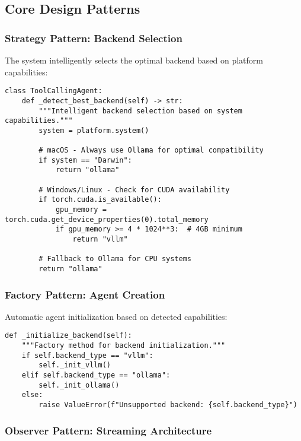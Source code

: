 \documentclass{article}
\begin{document}
\subsection{Core Design Patterns}

\subsubsection{Strategy Pattern: Backend Selection}

The system intelligently selects the optimal backend based on platform capabilities:

\begin{lstlisting}[caption=Backend Selection Strategy]
class ToolCallingAgent:
    def _detect_best_backend(self) -> str:
        """Intelligent backend selection based on system capabilities."""
        system = platform.system()

        # macOS - Always use Ollama for optimal compatibility
        if system == "Darwin":
            return "ollama"

        # Windows/Linux - Check for CUDA availability
        if torch.cuda.is_available():
            gpu_memory = torch.cuda.get_device_properties(0).total_memory
            if gpu_memory >= 4 * 1024**3:  # 4GB minimum
                return "vllm"

        # Fallback to Ollama for CPU systems
        return "ollama"
\end{lstlisting}

\subsubsection{Factory Pattern: Agent Creation}

Automatic agent initialization based on detected capabilities:




\begin{lstlisting}[caption=Factory Pattern Implementation]
def _initialize_backend(self):
    """Factory method for backend initialization."""
    if self.backend_type == "vllm":
        self._init_vllm()
    elif self.backend_type == "ollama":
        self._init_ollama()
    else:
        raise ValueError(f"Unsupported backend: {self.backend_type}")
\end{lstlisting}

\subsubsection{Observer Pattern: Streaming Architecture}
\end{document}
